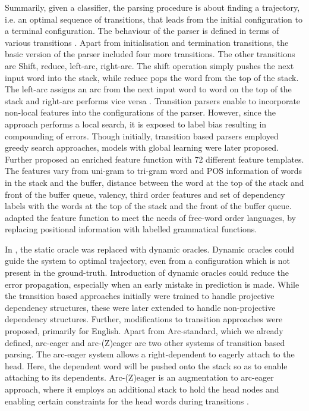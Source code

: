 \documentclass[11pt]{article}
\begin{document}
Summarily, given a classifier, the parsing procedure is about finding a trajectory, i.e. an optimal sequence of transitions, that leads from the initial configuration to a terminal configuration. The behaviour of the parser is defined in terms of various transitions \cite{mcdonald-nivre-2011-analyzing}. Apart from initialisation and termination transitions, the basic version of the parser included four more transitions. The other transitions are Shift, reduce, left-arc, right-arc. The shift operation simply pushes the next input word into the stack, while reduce pops the word from the top of the stack. The left-arc assigns an arc from the next input word to word on the top of the stack and right-arc performs vice versa \cite{mcdonald-nivre-2007-characterizing}.  Transition parsers enable to incorporate non-local features  into the configurations of the parser. However, since the approach performs a  local search, it is exposed to label bias resulting in compounding of errors. Though initially, transition based parsers employed greedy search approaches, models with global learning were later proposed. Further  proposed an enriched feature function with 72 different feature templates. The features vary from uni-gram to tri-gram word and POS information of words in the stack and the buffer, distance between the word at the top of the stack and front of the buffer queue, valency, third order features and set of dependency labels with the words at the top of the stack and the front of the buffer queue.  adapted the feature function to meet the needs of free-word order languages, by replacing positional information with labelled grammatical functions.

In , the static oracle was replaced with dynamic oracles. Dynamic oracles could guide the system to optimal trajectory, even from a configuration which is not present in the ground-truth. Introduction of dynamic oracles could reduce the error propagation, especially when an early mistake in prediction is made. While the transition based approaches initially were trained to handle projective dependency structures, these were later extended to handle non-projective dependency structures. Further, modifications to transition approaches were proposed, primarily for English. Apart from Arc-standard, which we already defined, arc-eager and arc-(Z)eager are two other systems of transition based parsing. The arc-eager system allows a right-dependent to eagerly attach to the head.  Here, the dependent word will be pushed onto the stack so as to enable attaching to its dependents. Arc-(Z)eager is an augmentation to arc-eager approach, where it employs an additional stack to hold the head nodes and enabling certain constraints  for the head words during transitions \cite{more-etal-2019-joint}. 
\end{document}
